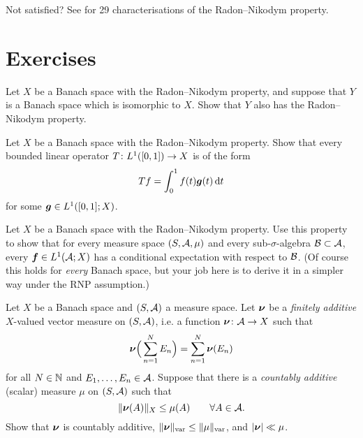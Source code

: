   
\begin{rmk}
  Not satisfied? See \cite[\textsection VII.6]{DU77} for 29 characterisations of the Radon--Nikodym property.
\end{rmk}


  


\section*{Exercises}

\begin{exercise}
  Let $X$ be a Banach space with the Radon--Nikodym property, and suppose that $Y$ is a Banach space which is isomorphic to $X$.
  Show that $Y$ also has the Radon--Nikodym property.
\end{exercise}

\begin{exercise}
  Let $X$ be a Banach space with the Radon--Nikodym property.
  Show that every bounded linear operator $T \colon L^1([0,1]) \rightarrow X$ is of the form
  \begin{equation*}
    Tf = \int_0^1 f(t) \bm{g}(t) \, \mathrm{d} t
  \end{equation*}
  for some $\bm{g} \in L^1([0,1];X)$.
\end{exercise}

\begin{exercise}
  Let $X$ be a Banach space with the Radon--Nikodym property.
  Use this property to show that for every measure space $(S,\mathcal{A},\mu)$ and every sub-$\sigma$-algebra $\mathcal{B} \subset \mathcal{A}$, every $\bm{f} \in L^1(\mathcal{A};X)$ has a conditional expectation with respect to $\mathcal{B}$.
  (Of course this holds for \emph{every} Banach space, but your job here is to derive it in a simpler way under the RNP assumption.)
\end{exercise}

\begin{exercise}\label{ex:fa-meas-ca}
  Let $X$ be a Banach space and $(S,\mathcal{A})$ a measure space.
  Let $\bm{\nu}$ be a \emph{finitely additive} $X$-valued vector measure on $(S,\mathcal{A})$, i.e. a function $\bm{\nu} \colon \mathcal{A} \rightarrow X$ such that
  \begin{equation*}
    \bm{\nu}\Big(\sum_{n=1}^{N} E_n\Big) = \sum_{n=1}^{N} \bm{\nu}(E_n)
  \end{equation*}
  for all $N \in \mathbb{N}$ and $E_1,\ldots,E_n \in \mathcal{A}$.
  Suppose that there is a \emph{countably additive} (scalar) measure $\mu$ on $(S,\mathcal{A})$ such that
  \begin{equation*}
    \|\bm{\nu}(A)\|_{X} \leq \mu(A) \qquad \forall A \in \mathcal{A}.
  \end{equation*}
  Show that $\bm{\nu}$ is countably additive, $\|\bm{\nu}\|_{\mathrm{var}} \leq \|\mu\|_{\mathrm{var}}$, and $|\bm{\nu}| \ll \mu$.
\end{exercise}

